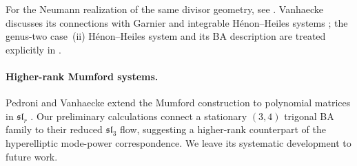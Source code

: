 For the Neumann realization of the same divisor geometry, see
\cite[Chapter~IIIa, \S4]{Mumford1984}. Vanhaecke discusses its
connections with Garnier and integrable H\'enon--Heiles systems
\cite{Vanhaecke2001}; the genus-two case~(ii) H\'enon--Heiles
system and its BA description are treated explicitly in
\cite[\S4]{Braden2005}.

\paragraph{Higher-rank Mumford systems.}
Pedroni and Vanhaecke extend the Mumford construction to polynomial
matrices in $\mathfrak{sl}_r$ \cite{PedroniVanhaecke1998}.
Our preliminary calculations connect a stationary $(3,4)$ trigonal
BA family to their reduced $\mathfrak{sl}_3$ flow, suggesting a
higher-rank counterpart of the hyperelliptic mode-power correspondence.
We leave its systematic development to future work.

